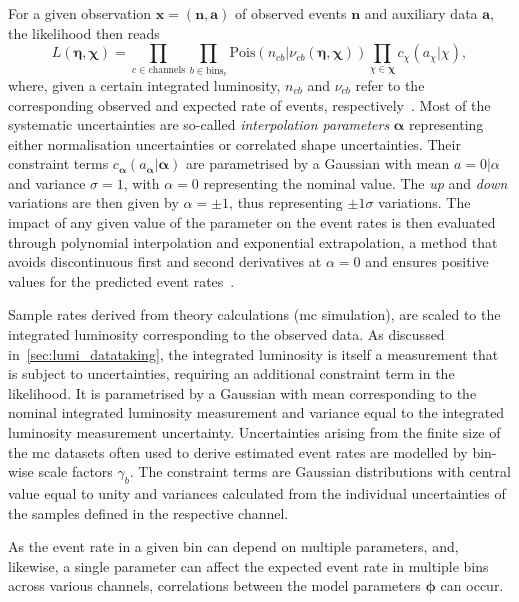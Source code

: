 For a given observation $\boldsymbol{x} = (\boldsymbol{n},\boldsymbol{a})$ of observed events $\boldsymbol{n}$ and auxiliary data $\boldsymbol{a}$, the likelihood then reads
\begin{equation}
	L (\boldsymbol{\eta}, \boldsymbol{\chi}) = \prod_{c\in\mathrm{channels}} \prod_{b\in\mathrm{bins_c}} \mathrm{Pois}(n_{cb}\vert\nu_{cb}(\boldsymbol{\eta},\boldsymbol{\chi})) \prod_{\chi\in\boldsymbol{\chi}}c_\chi (a_\chi\vert\chi),
\end{equation}
where, given a certain integrated luminosity, $n_{cb}$ and $\nu_{cb}$ refer to the corresponding observed and expected rate of events, respectively~\cite{ATL-PHYS-PUB-2019-029}. Most of the systematic uncertainties are so-called \textit{interpolation parameters} $\boldsymbol{\alpha}$ representing either normalisation uncertainties or correlated shape uncertainties. Their constraint terms $c_{\boldsymbol{\alpha}}(a_{\boldsymbol{\alpha}}\vert\boldsymbol{\alpha})$ are parametrised by a Gaussian with mean $a = 0\vert\alpha$ and variance $\sigma = 1$, with $\alpha = 0$ representing the nominal value. The \textit{up} and \textit{down} variations are then given by $\alpha=\pm 1$, thus representing $\pm 1\sigma$ variations. The impact of any given value of the parameter on the event rates is then evaluated through polynomial interpolation and exponential extrapolation, a method that avoids discontinuous first and second derivatives at $\alpha = 0$ and ensures positive values for the predicted event rates~\cite{Cranmer:1456844}.

Sample rates derived from theory calculations (\ie \gls{mc} simulation), are scaled to the integrated luminosity corresponding to the observed data. As discussed in~\cref{sec:lumi_datataking}, the integrated luminosity is itself a measurement that is subject to uncertainties, requiring an additional constraint term in the likelihood. It is parametrised by a Gaussian with mean corresponding to the nominal integrated luminosity measurement and variance equal to the integrated luminosity measurement uncertainty. Uncertainties arising from the finite size of the \gls{mc} datasets often used to derive estimated event rates are modelled by bin-wise scale factors $\gamma_b$. The constraint terms are Gaussian distributions with central value equal to unity and variances calculated from the individual uncertainties of the samples defined in the respective channel.

As the event rate in a given bin can depend on multiple parameters, and, likewise, a single parameter can affect the expected event rate in multiple bins across various channels, correlations between the model parameters $\boldsymbol{\phi}$ can occur.

